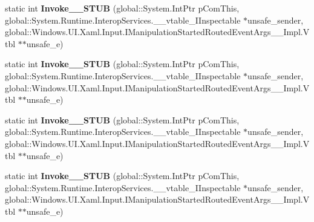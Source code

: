 \begin{DoxyCompactItemize}
\item 
\mbox{\label{struct_windows_1_1_u_i_1_1_xaml_1_1_input_1_1_manipulation_started_event_handler_____impl_1_1_vtbl_adf8a1eb6db03289ec3d2281fc6609817}} 
static int {\bfseries Invoke\+\_\+\+\_\+\+S\+T\+UB} (global\+::\+System.\+Int\+Ptr p\+Com\+This, global\+::\+System.\+Runtime.\+Interop\+Services.\+\_\+\+\_\+vtable\+\_\+\+I\+Inspectable $\ast$unsafe\+\_\+sender, global\+::\+Windows.\+U\+I.\+Xaml.\+Input.\+I\+Manipulation\+Started\+Routed\+Event\+Args\+\_\+\+\_\+\+Impl.\+Vtbl $\ast$$\ast$unsafe\+\_\+e)
\item 
\mbox{\label{struct_windows_1_1_u_i_1_1_xaml_1_1_input_1_1_manipulation_started_event_handler_____impl_1_1_vtbl_adf8a1eb6db03289ec3d2281fc6609817}} 
static int {\bfseries Invoke\+\_\+\+\_\+\+S\+T\+UB} (global\+::\+System.\+Int\+Ptr p\+Com\+This, global\+::\+System.\+Runtime.\+Interop\+Services.\+\_\+\+\_\+vtable\+\_\+\+I\+Inspectable $\ast$unsafe\+\_\+sender, global\+::\+Windows.\+U\+I.\+Xaml.\+Input.\+I\+Manipulation\+Started\+Routed\+Event\+Args\+\_\+\+\_\+\+Impl.\+Vtbl $\ast$$\ast$unsafe\+\_\+e)
\item 
\mbox{\label{struct_windows_1_1_u_i_1_1_xaml_1_1_input_1_1_manipulation_started_event_handler_____impl_1_1_vtbl_adf8a1eb6db03289ec3d2281fc6609817}} 
static int {\bfseries Invoke\+\_\+\+\_\+\+S\+T\+UB} (global\+::\+System.\+Int\+Ptr p\+Com\+This, global\+::\+System.\+Runtime.\+Interop\+Services.\+\_\+\+\_\+vtable\+\_\+\+I\+Inspectable $\ast$unsafe\+\_\+sender, global\+::\+Windows.\+U\+I.\+Xaml.\+Input.\+I\+Manipulation\+Started\+Routed\+Event\+Args\+\_\+\+\_\+\+Impl.\+Vtbl $\ast$$\ast$unsafe\+\_\+e)
\item 
\mbox{\label{struct_windows_1_1_u_i_1_1_xaml_1_1_input_1_1_manipulation_started_event_handler_____impl_1_1_vtbl_adf8a1eb6db03289ec3d2281fc6609817}} 
static int {\bfseries Invoke\+\_\+\+\_\+\+S\+T\+UB} (global\+::\+System.\+Int\+Ptr p\+Com\+This, global\+::\+System.\+Runtime.\+Interop\+Services.\+\_\+\+\_\+vtable\+\_\+\+I\+Inspectable $\ast$unsafe\+\_\+sender, global\+::\+Windows.\+U\+I.\+Xaml.\+Input.\+I\+Manipulation\+Started\+Routed\+Event\+Args\+\_\+\+\_\+\+Impl.\+Vtbl $\ast$$\ast$unsafe\+\_\+e)

\end{DoxyCompactItemize}
